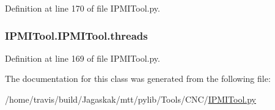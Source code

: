 Definition at line 170 of file I\-P\-M\-I\-Tool.\-py.

\hypertarget{classIPMITool_1_1IPMITool_a2f6ca8b0b509ba2c514b72312841b2d6}{
\subsubsection[{threads}]{\setlength{\rightskip}{0pt plus 5cm}I\-P\-M\-I\-Tool.\-I\-P\-M\-I\-Tool.\-threads}}\label{classIPMITool_1_1IPMITool_a2f6ca8b0b509ba2c514b72312841b2d6}


Definition at line 169 of file I\-P\-M\-I\-Tool.\-py.



The documentation for this class was generated from the following file\-:\begin{DoxyCompactItemize}
\item 
/home/travis/build/\-Jagaskak/mtt/pylib/\-Tools/\-C\-N\-C/\hyperlink{IPMITool_8py}{I\-P\-M\-I\-Tool.\-py}\end{DoxyCompactItemize}
